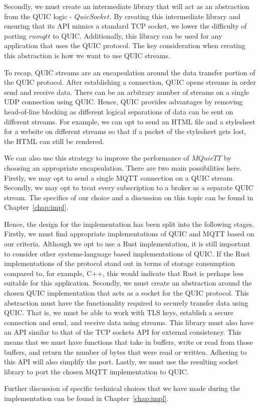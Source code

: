 Secondly, we must create an intermediate library that will act as an abstraction from the QUIC logic - $QuicSocket$.
By creating this intermediate library and ensuring that its API mimics a standard TCP socket, we lower the difficulty of porting $rumqtt$ to QUIC.
Additionally, this library can be used for any application that uses the QUIC protocol.
The key consideration when creating this abstraction is how we want to use QUIC streams.

To recap, QUIC streams are an encapsulation around the data transfer portion of the QUIC protocol.
After establishing a connection, QUIC opens streams in order send and receive data.
There can be an arbitrary number of streams on a single UDP connection using QUIC.
Hence, QUIC provides advantages by removing head-of-line blocking as different logical separations of data can be sent on different streams.
For example, we can opt to send an HTML file and a stylesheet for a website on different streams so that if a packet of the stylesheet gets lost, the HTML can still be rendered.

We can also use this strategy to improve the performance of $MQuicTT$ by choosing an appropriate encapsulation.
There are two main possibilities here.
Firstly, we may opt to send a single MQTT connection on a QUIC stream.
Secondly, we may opt to treat every subscription to a broker as a separate QUIC stream.
The specifics of our choice and a discussion on this topic can be found in Chapter~\ref{chap:impl}.

Hence, the design for the implementation has been split into the following stages.
Firstly, we must find appropriate implementations of QUIC and MQTT based on our criteria.
Although we opt to use a Rust implementation, it is still important to consider other systems-language based implementations of QUIC.
If the Rust implementations of the protocol stand out in terms of storage consumption compared to, for example, C++, this would indicate that Rust is perhaps less suitable for this application.
Secondly, we must create an abstraction around the chosen QUIC implementation that acts as a socket for the QUIC protocol.
This abstraction must have the functionality required to securely transfer data using QUIC.
That is, we must be able to work with TLS keys, establish a secure connection and send, and receive data using streams.
This library must also have an API similar to that of the TCP sockets API for external consistency.
This means that we must have functions that take in buffers, write or read from those buffers, and return the number of bytes that were read or written.
Adhering to this API will also simplify the port.
Lastly, we must use the resulting socket library to port the chosen MQTT implementation to QUIC.

Further discussion of specific technical choices that we have made during the implementation can be found in Chapter~\ref{chap:impl}.



